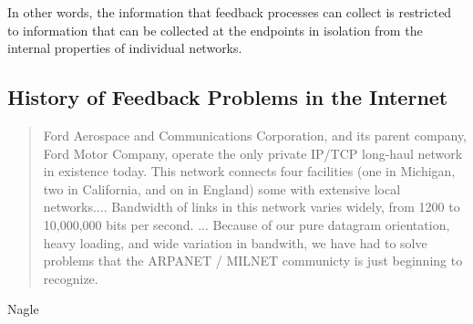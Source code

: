 


In other words, the information that feedback processes can collect is restricted to information
that can be collected at the endpoints in isolation from the internal properties of individual
networks.

\subsection{History of Feedback Problems in the Internet}


\begin{quote}
Ford Aerospace and Communications Corporation, and its parent company, Ford Motor Company, operate
    the only private IP/TCP long-haul network in existence today. This network connects four
    facilities (one in Michigan, two in California, and on in England) some with extensive local
    networks.... Bandwidth of links in this network varies widely, from 1200 to 10,000,000 bits per
    second. ... Because of our pure datagram orientation, heavy loading, and wide variation in
    bandwith, we have had to solve problems that the ARPANET / MILNET communicty is just beginning
    to recognize.
\end{quote}


Nagle \cite{rfc896}

